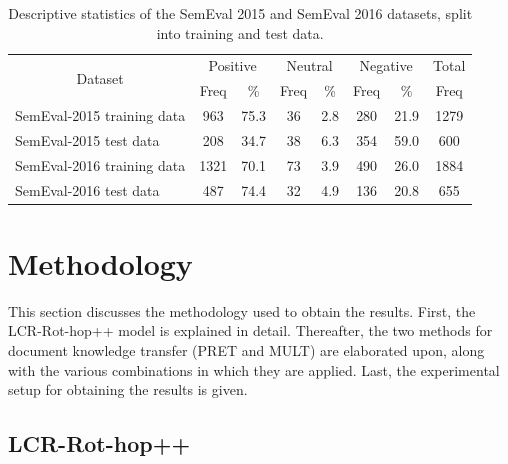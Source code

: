 \documentclass[runningheads]{llncs}
\begin{document}
\begin{table}[h]
\caption{Descriptive statistics of the SemEval 2015 and SemEval 2016 datasets, split into training and test data.}
\label{describeData}
\setlength{\tabcolsep}{8.2pt}
\begin{tabular}{@{}lccccccc@{}}
\toprule
\multicolumn{1}{c}{\multirow{2}{*}{Dataset}} & \multicolumn{2}{c}{Positive} & \multicolumn{2}{c}{Neutral} & \multicolumn{2}{c}{Negative} & Total \\ \cmidrule(l){2-8} 
\multicolumn{1}{c}{}                         & Freq          & \%           & Freq          & \%          & Freq          & \%           & Freq  \\ \midrule
SemEval-2015 training data                   & 963           & 75.3         & 36            & 2.8         & 280           & 21.9         & 1279  \\
SemEval-2015 test data                       & 208           & 34.7         & 38            & 6.3         & 354           & 59.0         & 600   \\
SemEval-2016 training data                   & 1321          & 70.1         & 73            & 3.9         & 490           & 26.0         & 1884  \\
SemEval-2016 test data                       & 487           & 74.4         & 32            & 4.9         & 136           & 20.8         & 655   \\ \bottomrule
\end{tabular}
\vspace{-5mm}
\end{table}

\section{Methodology}
\label{sec:methodology}

This section discusses the methodology used to obtain the results. First, the LCR-Rot-hop++ model is explained in detail. Thereafter, the two methods for document knowledge transfer (PRET and MULT) are elaborated upon, along with the various combinations in which they are applied. Last, the experimental setup for obtaining the results is given.

\subsection{LCR-Rot-hop++}
\end{document}
